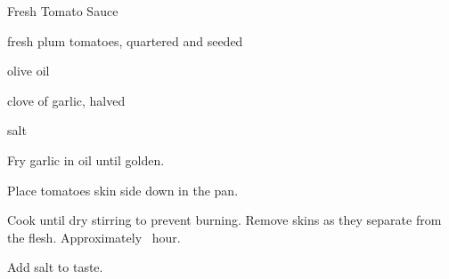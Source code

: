 \begin{recipe}{Fresh Tomato Sauce}{}{}

\begin{ingredients}
\item fresh plum tomatoes, quartered and seeded
\item olive oil
\item clove of garlic, halved
\item salt
\end{ingredients}

\begin{directions}
\item Fry garlic in oil until golden.
\item Place tomatoes skin side down in the pan.
\item Cook until dry stirring to prevent burning. Remove skins as they separate from the flesh. Approximately \half~hour.
\item Add salt to taste.
\end{directions}

\end{recipe}
